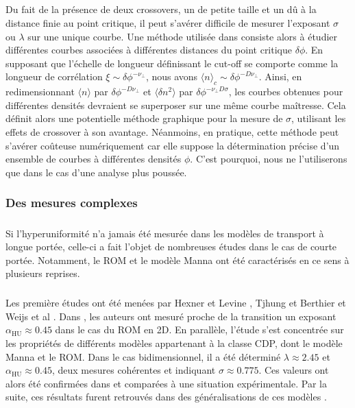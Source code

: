 \subparagraph{}Du fait de la présence de deux crossovers, un de petite taille et un dû à la distance finie au point critique, il peut s'avérer difficile de mesurer l'exposant $\sigma$ ou $\lambda$ sur une unique courbe. Une méthode utilisée dans \cite{hexner_hyperuniformity_2015} consiste alors à étudier différentes courbes associées à différentes distances du point critique $\delta\phi$. En supposant que l'échelle de longueur définissant le cut-off se comporte comme la longueur de corrélation $\xi\sim \delta\phi^{-\nu_\perp}$, nous avons $\langle n \rangle_c \sim \delta\phi^{-D\nu_\perp}$. Ainsi, en redimensionnant $\langle n \rangle$ par $ \delta\phi^{-D\nu_\perp}$ et $\langle \delta n^2 \rangle$ par $\delta\phi^{-\nu_\perp D \sigma}$, les courbes obtenues pour différentes densités devraient se superposer sur une même courbe maîtresse. Cela définit alors une potentielle méthode graphique pour la mesure de $\sigma$, utilisant les effets de crossover à son avantage. Néanmoins, en pratique, cette méthode peut s'avérer coûteuse numériquement car elle suppose la détermination précise d'un ensemble de courbes à différentes densités $\phi$. C'est pourquoi, nous ne l'utiliserons que dans le cas d'une analyse plus poussée.

\subsubsection{Des mesures complexes}

\subparagraph{}Si l'hyperuniformité n'a jamais été mesurée dans les modèles de transport à longue portée, celle-ci a fait l'objet de nombreuses études dans le cas de courte portée. Notamment, le ROM et le modèle Manna ont été caractérisés en ce sens à plusieurs reprises.

\subparagraph{}Les première études ont été menées par Hexner et Levine \cite{hexner_hyperuniformity_2015}, Tjhung et Berthier \cite{tjhung_hyperuniform_2015} et Weijs et al \cite{weijs_emergent_2015}. Dans \cite{tjhung_hyperuniform_2015}, les auteurs ont mesuré proche de la transition un exposant $\alpha_\text{HU} \approx 0.45$ dans le cas du ROM en 2D. En parallèle, l'étude \cite{hexner_hyperuniformity_2015} s'est concentrée sur les propriétés de différents modèles appartenant à la classe CDP, dont le modèle Manna et le ROM. Dans le cas bidimensionnel, il a été déterminé $\lambda\approx 2.45$ et $\alpha_\text{HU}\approx 0.45$, deux mesures cohérentes et indiquant $\sigma \approx 0.775$. Ces valeurs ont alors été confirmées dans \cite{weijs_emergent_2015} et comparées à une situation expérimentale. Par la suite, ces résultats furent retrouvés dans des généralisations de ces modèles \cite{hexner_noise_2017, ma_hyperuniformity_2019}.

